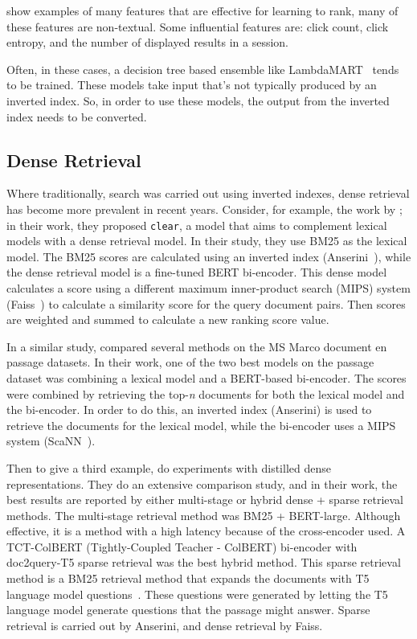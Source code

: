  show examples of many features that are effective for learning to rank, many of these features are non-textual. Some influential features are: click count, click entropy, and the number of displayed results in a session.

Often, in these cases, a decision tree based ensemble like LambdaMART~\citep{lambdamart} tends to be trained. These models take input that's not typically produced by an inverted index. So, in order to use these models, the output from the inverted index needs to be converted. 

\subsection{Dense Retrieval}
Where traditionally, search was carried out using inverted indexes, dense retrieval has become more prevalent in recent years. Consider, for example, the work by \citet{dense-retrieval-1}; in their work, they proposed \texttt{clear}, a model that aims to complement lexical models with a dense retrieval model. In their study, they use BM25 as the lexical model. The BM25 scores are calculated using an inverted index (Anserini~\citep{anserini}), while the dense retrieval model is a fine-tuned BERT bi-encoder. This dense model calculates a score using a different maximum inner-product search (MIPS) system (Faiss~\citep{faiss}) to calculate a similarity score for the query document pairs. Then scores are weighted and summed to calculate a new ranking score value. 

In a similar study, \citet{dense-retrieval-2} compared several methods on the MS Marco document en passage datasets. In their work, one of the two best models on the passage dataset was combining a lexical model and a BERT-based bi-encoder. The scores were combined by retrieving the top-\textit{n} documents for both the lexical model and the bi-encoder. In order to do this, an inverted index (Anserini) is used to retrieve the documents for the lexical model, while the bi-encoder uses a MIPS system (ScaNN~\citep{scann}).

Then to give a third example, \citet{dense-retrieval-3} do experiments with distilled dense representations. They do an extensive comparison study, and in their work, the best results are reported by either multi-stage or hybrid dense + sparse retrieval methods. The multi-stage retrieval method was BM25 + BERT-large. Although effective, it is a method with a high latency because of the cross-encoder used. A TCT-ColBERT (Tightly-Coupled Teacher - ColBERT) bi-encoder with doc2query-T5 sparse retrieval was the best hybrid method. This sparse retrieval method is a BM25 retrieval method that expands the documents with T5 language model questions~\citep{2020t5}. These questions were generated by letting the T5 language model generate questions that the passage might answer. Sparse retrieval is carried out by Anserini, and dense retrieval by Faiss. 

